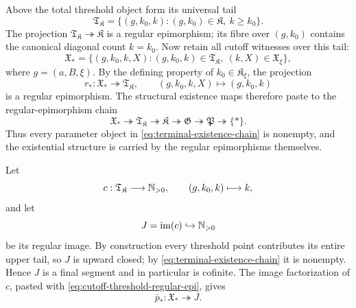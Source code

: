 Above the total threshold object form its universal tail
\begin{equation}\label{eq:terminal-threshold-tail}
\mathfrak T_{\mathfrak K}
=
\{(g,k_0,k):(g,k_0)\in\mathfrak K,\ k\ge k_0\}.
\end{equation}
The projection $\mathfrak T_{\mathfrak K}\twoheadrightarrow\mathfrak K$ is a regular epimorphism; its fibre over $(g,k_0)$ contains the canonical diagonal count $k=k_0$.  Now retain all cutoff witnesses over this tail:
\begin{equation}\label{eq:universal-cutoff-incidence}
\mathfrak X_*
=
\{(g,k_0,k,X):(g,k_0,k)\in\mathfrak T_{\mathfrak K},\ (k,X)\in\mathfrak X_\xi\},
\end{equation}
where $g=(a,B,\xi)$.  By the defining property of $k_0\in\mathfrak K_\xi$, the projection
\begin{equation}\label{eq:cutoff-threshold-regular-epi}
r_*:\mathfrak X_*\twoheadrightarrow\mathfrak T_{\mathfrak K},
\qquad
(g,k_0,k,X)\longmapsto(g,k_0,k)
\end{equation}
is a regular epimorphism.  The structural existence maps therefore paste to the regular-epimorphism chain
\begin{equation}\label{eq:terminal-existence-chain}
\mathfrak X_*
\mathrel{\twoheadrightarrow}
\mathfrak T_{\mathfrak K}
\mathrel{\twoheadrightarrow}
\mathfrak K
\mathrel{\twoheadrightarrow}
\mathfrak G
\mathrel{\twoheadrightarrow}
\mathfrak P
\mathrel{\twoheadrightarrow}
\{*\}.
\end{equation}
Thus every parameter object in \eqref{eq:terminal-existence-chain} is nonempty, and the existential structure is carried by the regular epimorphisms themselves.

Let
\[
c:\mathfrak T_{\mathfrak K}\longrightarrow\mathbb N_{>0},
\qquad
(g,k_0,k)\longmapsto k,
\]
and let
\begin{equation}\label{eq:terminal-count-image}
J=\operatorname{im}(c)\hookrightarrow\mathbb N_{>0}
\end{equation}
be its regular image.  By construction every threshold point contributes its entire upper tail, so $J$ is upward closed; by \eqref{eq:terminal-existence-chain} it is nonempty.  Hence $J$ is a final segment and in particular is cofinite.  The image factorization of $c$, pasted with \eqref{eq:cutoff-threshold-regular-epi}, gives
\begin{equation}\label{eq:cutoff-count-regular-epi}
\bar p_*:\mathfrak X_*\twoheadrightarrow J.
\end{equation}

